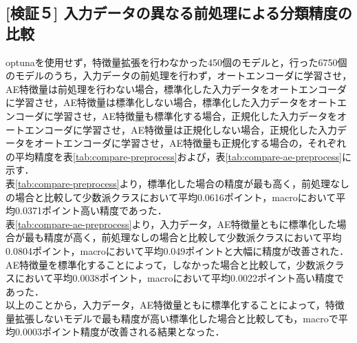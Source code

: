 \subsection{[検証５] 入力データの異なる前処理による分類精度の比較}
optunaを使用せず，特徴量拡張を行わなかった450個のモデルと，行った6750個のモデルのうち，入力データの前処理を行わず，オートエンコーダに学習させ，AE特徴量は前処理を行わない場合，標準化した入力データをオートエンコーダに学習させ，AE特徴量は標準化しない場合，標準化した入力データをオートエンコーダに学習させ，AE特徴量も標準化する場合，正規化した入力データをオートエンコーダに学習させ，AE特徴量は正規化しない場合，正規化した入力データをオートエンコーダに学習させ，AE特徴量も正規化する場合の，それぞれの平均精度を表\ref{tab:compare-preprocess}および，表\ref{tab:compare-ae-preprocess}に示す．\\
表\ref{tab:compare-preprocess}より，標準化した場合の精度が最も高く，前処理なしの場合と比較して少数派クラスにおいて平均0.0616ポイント，macroにおいて平均0.0371ポイント高い精度であった．\\
表\ref{tab:compare-ae-preprocess}より，入力データ，AE特徴量ともに標準化した場合が最も精度が高く，前処理なしの場合と比較して少数派クラスにおいて平均0.0804ポイント，macroにおいて平均0.049ポイントと大幅に精度が改善された．\\
AE特徴量を標準化することによって，しなかった場合と比較して，少数派クラスにおいて平均0.0038ポイント，macroにおいて平均0.0022ポイント高い精度であった．\\
以上のことから，入力データ，AE特徴量ともに標準化することによって，特徴量拡張しないモデルで最も精度が高い標準化した場合と比較しても，macroで平均0.0003ポイント精度が改善される結果となった．\\

